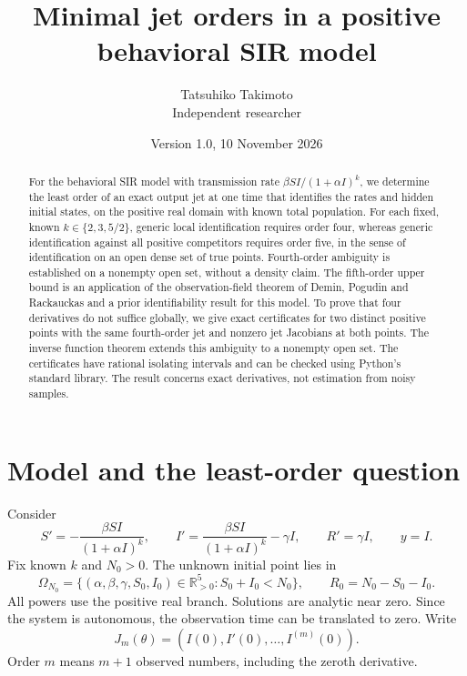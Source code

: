 \documentclass[10pt,a4paper]{article}
\title{Minimal jet orders in a positive behavioral SIR model}
\author{Tatsuhiko Takimoto\\\small Independent researcher}
\date{Version 1.0, 10 November 2026}
\newcommand{\R}{\mathbb R}
\begin{document}
\maketitle
\begin{abstract}
For the behavioral SIR model with transmission rate
$\beta SI/(1+\alpha I)^k$, we determine the least order of an exact
output jet at one time that identifies the rates and hidden initial
states, on the positive real domain with known total population.
For each fixed, known $k\in\{2,3,5/2\}$, generic local identification
requires order four, whereas generic identification against all positive
competitors requires order five, in the sense of identification on an
open dense set of true points. Fourth-order ambiguity is established
on a nonempty open set, without a density claim. The fifth-order upper bound is an
application of the observation-field theorem of Demin, Pogudin and
Rackauckas and a prior identifiability result for this model. To prove
that four derivatives do not suffice globally, we give exact certificates
for two distinct positive points with the same fourth-order jet and
nonzero jet Jacobians at both points. The inverse function theorem
extends this ambiguity to a nonempty open set. The certificates have
rational isolating intervals and can be checked using Python's standard
library. The result concerns exact derivatives, not estimation from
noisy samples.
\end{abstract}

\section{Model and the least-order question}
\label{sec:model}
Consider
\begin{equation}
S'=-\frac{\beta SI}{(1+\alpha I)^k},\qquad
I'=\frac{\beta SI}{(1+\alpha I)^k}-\gamma I,\qquad
R'=\gamma I,\qquad y=I.
\label{eq:model}
\end{equation}
Fix known $k$ and $N_0>0$. The unknown initial point lies in
\[
\Omega_{N_0}=\{(\alpha,\beta,\gamma,S_0,I_0)\in\R_{>0}^5:
S_0+I_0<N_0\},\qquad R_0=N_0-S_0-I_0.
\]
All powers use the positive real branch. Solutions are analytic near
zero. Since the system is autonomous, the observation time can be
translated to zero. Write
\begin{equation}
J_m(\theta)=(I(0),I'(0),\ldots,I^{(m)}(0)).
\label{eq:jet}
\end{equation}
Order $m$ means $m+1$ observed numbers, including the zeroth derivative.
\end{document}
